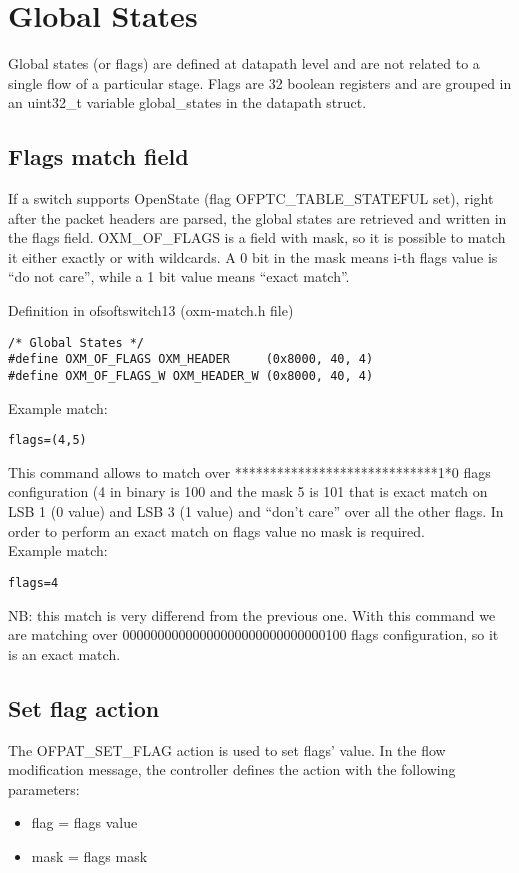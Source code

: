
\chapter{Global States}
\label{chap:global_states}
Global states (or flags) are defined at datapath level and are not related to a single flow of a particular stage.
Flags are 32 boolean registers and are grouped in an uint32\_t variable global\_states in the datapath struct.

\section{Flags match field}
\label{section:oxm_of_flags}

If a switch supports OpenState (flag OFPTC\_TABLE\_STATEFUL set), right after the packet headers are parsed, the global states are retrieved and written in the flags field. OXM\_OF\_FLAGS is a field with mask, so it is possible to match it either exactly or with wildcards. A 0 bit in the mask means i-th flags value is ``do not care'', while a 1 bit value means ``exact match''.

Definition in ofsoftswitch13 (oxm-match.h file)
\begin{verbatim}
/* Global States */
#define OXM_OF_FLAGS OXM_HEADER     (0x8000, 40, 4)
#define OXM_OF_FLAGS_W OXM_HEADER_W (0x8000, 40, 4)
\end{verbatim}
Example match:
\begin{verbatim}
flags=(4,5)
\end{verbatim}
This command allows to match over *****************************1*0 flags configuration (4 in binary is 100 and the mask 5 is 101 that is exact match on LSB 1 (0 value) and LSB 3 (1 value) and ``don’t care'' over all the other flags. In order to perform an exact match on flags value no mask is required.
\\Example match:
\begin{verbatim}
flags=4
\end{verbatim}
NB: this match is very differend from the previous one. With this command we are matching over 00000000000000000000000000000100 flags configuration, so it is an exact match.

\section{Set flag action}
\label{section:set_flag_action}
The OFPAT\_SET\_FLAG action is used to set flags' value.
In the flow modification message, the controller defines the action with the following parameters:
\begin{itemize}
\setlength\itemsep{0em}
\item flag = flags value
\item mask = flags mask
\end{itemize}


